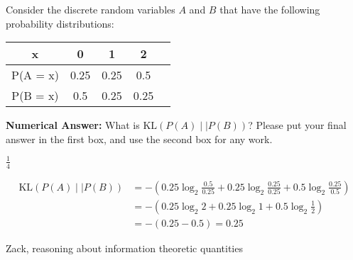 \begin{parts}
\begin{subparts}
\subpart[2] Consider the discrete random variables $A$ and $B$ that have the following probability distributions:
\begin{table}[H]
  \centering
\begin{tabular}{ccccc}
  \toprule
  x & 0 & 1 & 2 \\ \midrule
  P(A = x) & 0.25 & 0.25 & 0.5 \\
  P(B = x) & 0.5 & 0.25 & 0.25 \\
  \bottomrule
\end{tabular}
\label{tab:kldata}
\end{table}

\textbf{Numerical Answer:} What is $\text{KL}(P(A) \mid\mid P(B))$? Please put your final answer in the first box, and use the second box for any work.

\begin{tcolorbox}[fit,height=1cm, width=2cm, blank, borderline={1pt}{-2pt}]
    \begin{soln}
        $\frac{1}{4}$
    \end{soln}
\end{tcolorbox} \begin{tcolorbox}[fit,height=3cm, width=11cm, blank, borderline={1pt}{-2pt}]
    \begin{soln}
        \begin{align}
            \text{KL}(P(A) \mid\mid P(B)) &= - \left(0.25\log_2\frac{0.5}{0.25} + 0.25\log_2\frac{0.25}{0.25} + 0.5\log_2\frac{0.25}{0.5}\right)\\
            &= -\left(0.25\log_2 2 + 0.25\log_2 1 + 0.5\log_2\frac{1}{2}\right)\\
            &= -\left(0.25 - 0.5\right) = 0.25
        \end{align}
    \end{soln}
\end{tcolorbox}
    \begin{qauthor}
        Zack, reasoning about information theoretic quantities
    \end{qauthor}
\end{subparts}


\end{parts}
